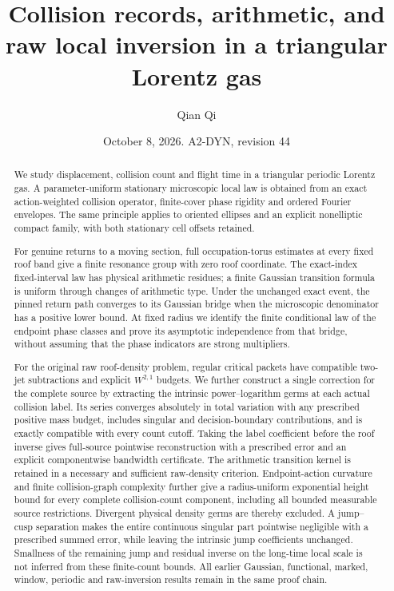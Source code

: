 \documentclass[11pt,reqno]{amsart}
\title[Collision records and raw local inversion]{Collision records, arithmetic, and raw local inversion in a triangular Lorentz gas}
\author{Qian Qi}
\date{October 8, 2026. A2-DYN, revision 44}
\numberwithin{equation}{section}
\theoremstyle{definition}\newtheorem{definition}[theorem]{Definition}
\theoremstyle{remark}\newtheorem{remark}[theorem]{Remark}
\begin{document}
\raggedbottom
\begin{abstract}
We study displacement, collision count and flight time in a triangular
periodic Lorentz gas. A parameter-uniform stationary microscopic local
law is obtained from an exact action-weighted collision operator,
finite-cover phase rigidity and ordered Fourier envelopes. The same
principle applies to oriented ellipses and an explicit nonelliptic
compact family, with both stationary cell offsets retained.

For genuine returns to a moving section, full occupation-torus
estimates at every fixed roof band give a finite resonance group with
zero roof coordinate. The exact-index fixed-interval law has physical
arithmetic residues; a finite Gaussian transition formula is uniform
through changes of arithmetic type. Under the unchanged exact event,
the pinned return path converges to its Gaussian bridge when the
microscopic denominator has a positive lower bound. At fixed radius
we identify the finite conditional law of the endpoint phase classes
and prove its asymptotic independence from that bridge, without
assuming that the phase indicators are strong multipliers.

For the original raw roof-density problem, regular critical packets
have compatible two-jet subtractions and explicit $W^{2,1}$ budgets.
We further construct a single correction for the complete source by
extracting the intrinsic power--logarithm germs at each actual collision
label. Its series converges absolutely in total variation with any
prescribed positive mass budget, includes singular and decision-boundary
contributions, and is exactly compatible with every count cutoff.
Taking the label coefficient before the roof inverse gives full-source
pointwise reconstruction with a prescribed error and an explicit
componentwise bandwidth certificate. The arithmetic transition kernel
is retained in a necessary and sufficient raw-density criterion.
Endpoint-action curvature and finite collision-graph complexity further
give a radius-uniform exponential height bound for every complete
collision-count component, including all bounded measurable source
restrictions. Divergent physical density germs are thereby excluded.
A jump--cusp separation makes the entire continuous singular part
pointwise negligible with a prescribed summed error, while leaving
the intrinsic jump coefficients unchanged. Smallness of the remaining
jump and residual inverse on the long-time local scale is not inferred
from these finite-count bounds. All earlier Gaussian, functional,
marked, window, periodic and raw-inversion results remain in the same
proof chain.
\end{abstract}
\maketitle
\enlargethispage{3pt}
\end{document}
